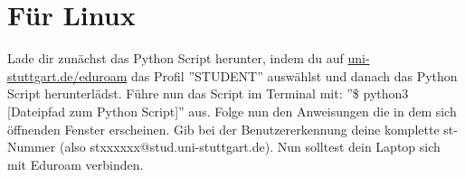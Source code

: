 \section*{Für Linux}
Lade dir zunächst das Python Script herunter, indem du auf \href{\eduroamurllinux}{uni-stuttgart.de/eduroam} das Profil ''STUDENT'' auswählst und danach das Python Script herunterlädst.\newline
Führe nun das Script im Terminal mit: ''\$ python3 [Dateipfad zum Python Script]'' aus. Folge nun den Anweisungen die in dem sich öffnenden Fenster erscheinen. Gib bei der Benutzererkennung deine komplette st-Nummer (also stxxxxxx@stud.uni-stuttgart.de).\newline
Nun solltest dein Laptop sich mit Eduroam verbinden.